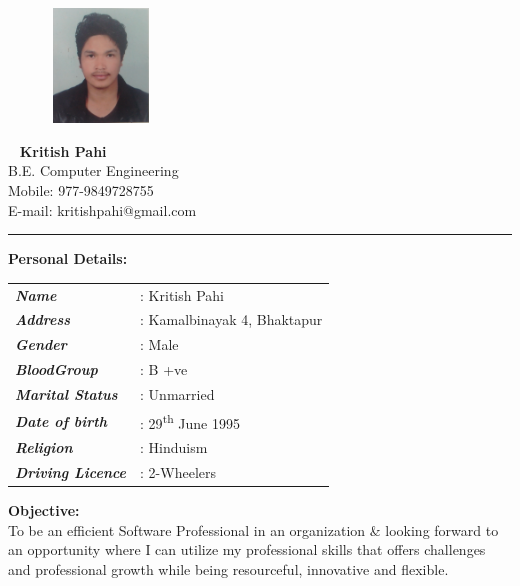 \documentclass[a4paper, 12pt]{article}
\begin{document}
\pagestyle{empty}



\begin{figure}
	\includegraphics[height=1.20in, width=1.10in]{k}
\end{figure}
~
{\Huge
	\textbf{Kritish Pahi} \\}
	B.E. Computer Engineering\\
	{Mobile: 977-9849728755}\\
	{E-mail: kritishpahi@gmail.com}\\
\vspace{2.2mm}
	
 \rule[2pt]{0.9\textwidth}{1pt}
\vspace{1mm}

{ \Large \textbf{Personal Details:}\\
}
\begin{tabular}{l l}
	 \textbf{\emph{Name }} & : Kritish Pahi \\
	 \textbf{\emph{Address }}&  : Kamalbinayak 4, Bhaktapur \\
	 \textbf{\emph{Gender }} & : Male \\
	 \textbf{\emph{BloodGroup}} & : B +ve \\
	 \textbf{\emph{Marital Status }} & : Unmarried \\ 
	 \textbf{\emph{Date of birth }} & : 29\textsuperscript{th} June 1995 \\ 
	 \textbf{\emph{Religion }} & : Hinduism \\ 
	 \textbf{\emph{Driving Licence}} & : 2-Wheelers 
\end{tabular}
\vspace{8mm}

{\Large \textbf{Objective:} \\ 
}
To be an efficient Software Professional in an organization \& looking forward
to an opportunity where I can utilize my professional skills that offers 
challenges and professional growth while being resourceful, innovative 
and flexible.
\end{document}
